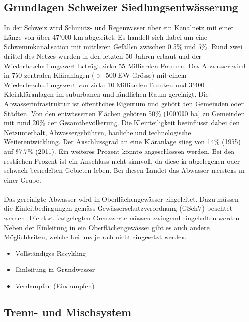 \documentclass[9pt, openright=false]{scrartcl}
\begin{document}
\subsection{Grundlagen Schweizer Siedlungsentwässerung} 
In der Schweiz wird Schmutz- und Regenwasser über ein Kanalnetz mit einer Länge von über 47'000 km abgeleitet. Es handelt sich dabei um eine Schwemmkanalisation mit mittleren Gefällen zwischen 0.5\% und 5\%. Rund zwei drittel des Netzes wurden in den letzten 50 Jahren erbaut und der Wiederbeschaffungswert beträgt zirka 55 Milliarden Franken. Das Abwasser wird in 750 zentralen Kläranlagen ($>$ 500 EW Grösse) mit einem Wiederbeschaffungswert von zirka 10 Milliarden Franken und 3'400 Kleinkläranlagen im suburbanen und ländlichen Raum gereinigt. Die Abwasserinfrastruktur ist öffentliches Eigentum und gehört den Gemeinden oder Städten. \clearpage
Von den entwässerten Flächen gehören 50\% (100'000 ha) zu Gemeinden mit rund 20\% der Gesamtbevölkerung. Die Kleinteiligkeit beeinflusst dabei den Netzunterhalt, Abwassergebühren, bauliche und technologische Weiterentwicklung. Der Anschlussgrad an eine Kläranlage stieg von 14\% (1965) auf 97.7\% (2011). Ein weiteres Prozent könnte angeschlossen werden. Bei den restlichen Prozent ist ein Anschluss nicht sinnvoll, da diese in abgelegenen oder schwach besiedelten Gebieten leben. Bei diesen Landet das Abwasser meistens in einer Grube.\\ \\
Das gereinigte Abwasser wird in Oberflächengewässer eingeleitet. Dazu müssen die Einleitbedingungen gemäss Gewässerschutzverordnung (GSchV) beachtet werden. Die dort festgelegten Grenzwerte müssen zwingend eingehalten werden. Neben der Einleitung in ein Oberflächengewässer gibt es auch andere Möglichkeiten, welche bei uns jedoch nicht eingesetzt werden:
\begin{itemize}
\item Vollständiges Recykling
\item Einleitung in Grundwasser
\item Verdampfen (Eindampfen)
\end{itemize}
\subsection{Trenn- und Mischsystem}
\end{document}
